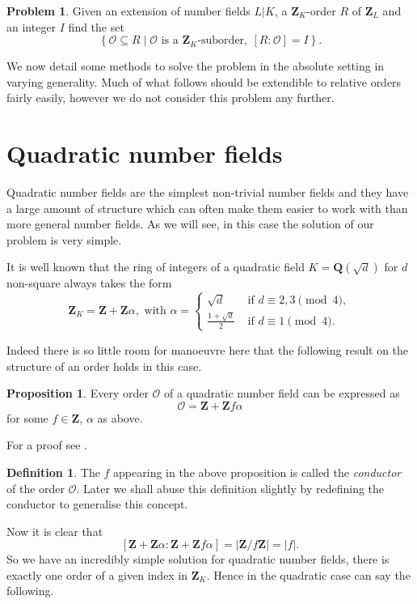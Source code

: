 \documentclass[12pt,a4paper,abstracton,bibtotoc]{scrreprt}
\theoremstyle{definition}
\newtheorem{prop}{Proposition}
\newtheorem{defn}{Definition}
\newtheorem{prob}{Problem}
\newcommand{\QQ}{\mathbf{Q}}
\newcommand{\ZZ}{\mathbf{Z}}
\renewcommand{\O}{\mathcal{O}}
\begin{document}
\begin{prob} %
\label{prob:rel}
Given an extension of number fields $L|K$, a $\ZZ_K$-order $R$ of $\ZZ_L$ and an integer $I$ find the set
\[
\left\{ \O\subseteq R \mid \O\text{ is a $\ZZ_K$-suborder},\ [R:\O] = I\right\}.
\]
\end{prob}

We now detail some methods to solve the problem in the absolute setting in varying generality.
Much of what follows should be extendible to relative orders fairly easily, however we do not consider this problem any further.

\section{Quadratic number fields}

Quadratic number fields are the simplest non-trivial number fields and they have a large amount of structure which can often make them easier to work with than more general number fields.
As we will see, in this case the solution of our problem is very simple.

It is well known \cite{lang} that the ring of integers of a quadratic field $K = \QQ(\sqrt{d})$ for $d$ non-square always takes the form
\[\ZZ_K = \ZZ + \ZZ\alpha,\text{ with } \alpha =\begin{cases}
\sqrt{d}&\text{ if $d\equiv 2,3\pmod{4}$},\\
\frac{1+\sqrt{d}}{2}&\text{ if $d\equiv 1\pmod{4}$}.
\end{cases}\]

Indeed there is so little room for manoeuvre here that the following result on the structure of an order holds in this case.

\begin{prop}
\label{prop:quadord}
Every order $\O$ of a quadratic number field can be expressed as
\[
\O = \ZZ + \ZZ f\alpha
\]
for some $f\in \ZZ$, $\alpha$ as above.
\end{prop}

For a proof see \cite[pp. 133--134]{cox}.

\begin{defn}
The $f$ appearing in the above proposition is called the \emph{conductor} of the order $\O$.
Later we shall abuse this definition slightly by redefining the conductor to generalise this concept.
\end{defn}

Now it is clear that
\[
[\ZZ + \ZZ\alpha : \ZZ + \ZZ f \alpha] = |\ZZ/f\ZZ| = |f|.
\]
So we have an incredibly simple solution for quadratic number fields, there is exactly one order of a given index in $\ZZ_K$.
Hence in the quadratic case can say the following.
\end{document}
